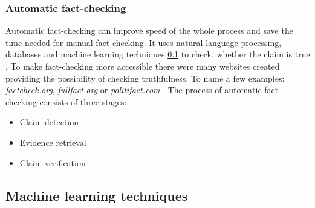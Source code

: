 \documentclass[11pt ,english,a4paper]{article}
\begin{document}

\subsubsection{Automatic fact-checking}\label{tech:fact:auto}
Automatic fact-checking can improve speed of the whole process and save the time needed for manual fact-checking. It uses natural language processing, databases and machine learning techniques \ref{tech:mach} to check, whether the claim is true \cite{gu22fact}. To make fact-checking more accessible there were many websites created providing the possibility of checking truthfulness. To name a few examples: \emph{factcheck.org}, \emph{fullfact.org} or \emph{politifact.com} \cite{alh18fact}.
The process of automatic fact-checking consists of three stages: \cite{gu22fact}
\begin{itemize}
\item Claim detection
\item Evidence retrieval
\item Claim verification
\end{itemize}

\subsection{Machine learning techniques} \label{tech:mach}


\end{document}
